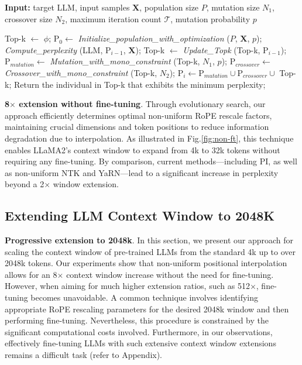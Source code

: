 \begin{algorithm}[t]
	\small
	\caption{The search algorithm}
	\textbf{Input:} target LLM, input samples $\mathbf{X}$, population size $P$, mutation size $N_1$, crossover size $N_2$, maximum iteration count $\mathcal{T}$, mutation probability $p$\\

	\begin{algorithmic}[1]
		\label{alg:search}
		\STATE Top-k $\gets$ $\phi$;
		\STATE $\text{P}_0 \gets$ \textit{Initialize\_population\_with\_optimization} ($P$, $\mathbf{X}$, $p$);
		\STATE \textit{Compute\_perplexity} (LLM, $\text{P}_{i-1}$, $\mathbf{X}$);
		\STATE Top-k $\gets$ \textit{Update\_Topk} (Top-k, $\text{P}_{i-1}$);
		\STATE $\text{P}_{mutation} \gets$ \textit{Mutation\_with\_mono\_constraint} (Top-k, $N_1$, $p$);
		\STATE $\text{P}_{crossover} \gets$ \textit{Crossover\_with\_mono\_constraint} (Top-k, $N_2$);
		\STATE $\text{P}_i \gets \text{P}_{mutation} \cup \text{P}_{crossover} \cup$ Top-k;
		\ENDFOR
		\STATE Return the individual in Top-k that exhibits the minimum perplexity;
	\end{algorithmic}
\end{algorithm}

\textbf{8$\times$ extension without fine-tuning}. Through evolutionary search, our approach efficiently determines optimal non-uniform RoPE rescale factors, maintaining crucial dimensions and token positions to reduce information degradation due to interpolation. As illustrated in Fig.\ref{fig:non-ft}, this technique enables LLaMA2's context window to expand from 4k to 32k tokens without requiring any fine-tuning. By comparison, current methods—including PI, as well as non-uniform NTK and YaRN—lead to a significant increase in perplexity beyond a 2$\times$ window extension.

\subsection{Extending LLM Context Window to 2048K}
\label{sec:extendto2048k}

\textbf{Progressive extension to 2048k}. In this section, we present our approach for scaling the context window of pre-trained LLMs from the standard 4k up to over 2048k tokens. Our experiments show that non-uniform positional interpolation allows for an 8$\times$ context window increase without the need for fine-tuning. However, when aiming for much higher extension ratios, such as 512$\times$, fine-tuning becomes unavoidable. A common technique involves identifying appropriate RoPE rescaling parameters for the desired 2048k window and then performing fine-tuning. Nevertheless, this procedure is constrained by the significant computational costs involved. Furthermore, in our observations, effectively fine-tuning LLMs with such extensive context window extensions remains a difficult task (refer to Appendix).

